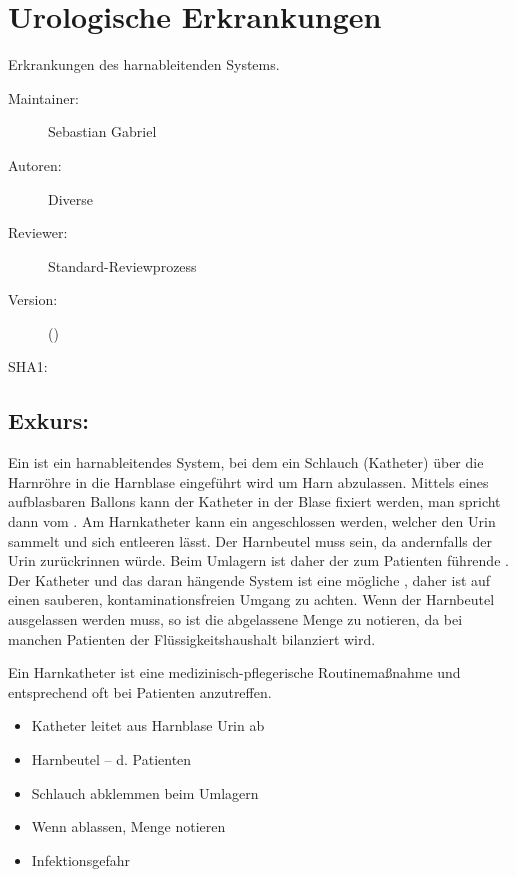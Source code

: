 \def\ChapterCode{URO}
\chapter
[\CO{[URO]} Urologische Erkrankungen]
{Urologische Erkrankungen}
\ChapterIntro
{%
Erkrankungen des harnableitenden Systems.
}
{%
\begin{description}
  \item[Maintainer:] Sebastian Gabriel
  \item[Autoren:] Diverse
  \item[Reviewer:] Standard-Reviewprozess
  \item[Version:] {\VarDocVersionTypeName} ({\VarDocVersionTypeDescription})
  \item[SHA1:] {\DocGitCommit}
\end{description}

{\TxTeilkapitelAASS}
}


\clearpage
\section{Exkurs: }


\TextSlide{\TxBeschreibung}
{Ein  ist ein harnableitendes System, bei dem ein
Schlauch (Katheter) über die Harnröhre in die Harnblase
eingeführt wird um Harn abzulassen. Mittels eines
aufblasbaren Ballons kann der Katheter in der Blase fixiert
werden, man spricht dann vom . Am
Harnkatheter kann ein  angeschlossen werden,
welcher den Urin sammelt und sich entleeren lässt. Der
Harnbeutel muss  sein, da
andernfalls der Urin zurückrinnen würde. Beim Umlagern
ist daher der zum Patienten führende . Der Katheter und das daran hängende System ist
eine mögliche , daher ist auf einen
sauberen, kontaminationsfreien Umgang zu achten.
Wenn der Harnbeutel ausgelassen werden muss, so ist die
abgelassene Menge zu notieren, da bei manchen Patienten der
Flüssigkeitshaushalt bilanziert wird.

Ein Harnkatheter ist eine
medizinisch-pflegerische Routinemaßnahme und entsprechend
oft bei Patienten anzutreffen.}
{
\begin{itemize}
  \item Katheter leitet aus Harnblase Urin ab
  \item Harnbeutel --  d. Patienten
  \item Schlauch abklemmen beim Umlagern
  \item Wenn ablassen, Menge notieren
  \item Infektionsgefahr
\end{itemize}
}
{}
{}
{}



